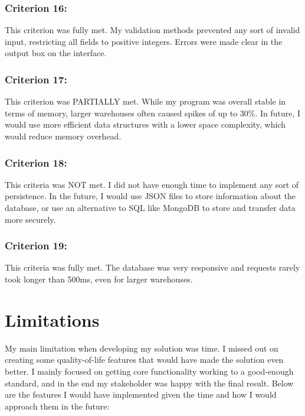 \subsubsection{Criterion 16:}

This criterion was fully met. My validation methods prevented any sort of invalid input, restricting all fields to positive integers. Errors were made clear in the output box on the interface.

\subsubsection{Criterion 17:}

This criterion was PARTIALLY met. While my program was overall stable in terms of memory, larger warehouses often caused spikes of up to 30\%. In future, I would use more efficient data structures with a lower space complexity, which would reduce memory overhead.

\subsubsection{Criterion 18:}

This criteria was NOT met. I did not have enough time to implement any sort of persistence. In the future, I would use JSON files to store information about the database, or use an alternative to SQL like MongoDB to store and transfer data more securely.

\subsubsection{Criterion 19:}

This criteria was fully met. The database was very responsive and requests rarely took longer than 500ms, even for larger warehouses.

\section{Limitations}

My main limitation when developing my solution was time. I missed out on creating some quality-of-life features that would have made the solution even better. I mainly focused on getting core functionality working to a good-enough standard, and in the end my stakeholder was happy with the final result. Below are the features I would have implemented given the time and how I would approach them in the future:

